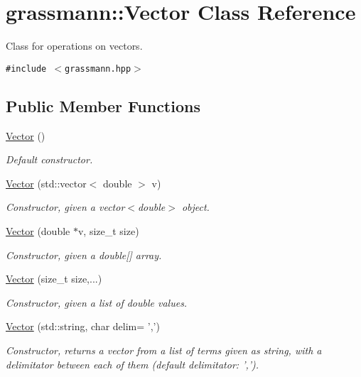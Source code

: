\hypertarget{classgrassmann_1_1Vector}{
\section{grassmann::Vector Class Reference}
\label{classgrassmann_1_1Vector}
}
Class for operations on vectors.  


{\tt \#include $<$grassmann.hpp$>$}

\subsection*{Public Member Functions}
\begin{CompactItemize}
\item 
\hyperlink{classgrassmann_1_1Vector_aa833e1ac1753a65c2885a9ce88ffeff}{Vector} ()
\begin{CompactList}\small\item\em Default constructor. \item\end{CompactList}\item 
\hyperlink{classgrassmann_1_1Vector_d8278186455c0ecbe065541a6c18a768}{Vector} (std::vector$<$ double $>$ v)
\begin{CompactList}\small\item\em Constructor, given a vector$<$double$>$ object. \item\end{CompactList}\item 
\hyperlink{classgrassmann_1_1Vector_5d7bb89bb3d2d8aa26309ca97ddcad66}{Vector} (double $\ast$v, size\_\-t size)
\begin{CompactList}\small\item\em Constructor, given a double\mbox{[}\mbox{]} array. \item\end{CompactList}\item 
\hyperlink{classgrassmann_1_1Vector_62ece542ba7c51a22866f6b8514f33ef}{Vector} (size\_\-t size,...)
\begin{CompactList}\small\item\em Constructor, given a list of double values. \item\end{CompactList}\item 
\hyperlink{classgrassmann_1_1Vector_dc3bff059e17ba7d3b71310d4cd01f0b}{Vector} (std::string, char delim= ',')
\begin{CompactList}\small\item\em Constructor, returns a vector from a list of terms given as string, with a delimitator between each of them (default delimitator: ','). \item\end{CompactList}\item 

\end{CompactItemize}
